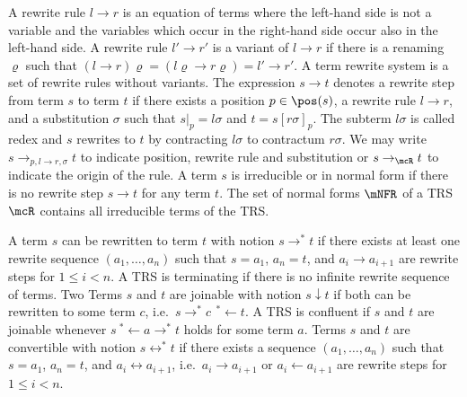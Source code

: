 \begin{definition}
A {\myem rewrite rule}  $l \rightarrow r$ is an equation of terms where the left-hand side is not a variable
and the variables which occur in the right-hand side occur also in the left-hand side.
A rewrite rule $l'\rightarrow r'$ is a {\myem variant} of $l\rightarrow r$ if there is a renaming $\varrho$ such that 
$(l\rightarrow r)\varrho = (l\varrho\rightarrow r\varrho) = l'\rightarrow r'$.
A {\myem term rewrite system} is a set of rewrite rules without variants.
%
The expression $s\rightarrow t$ denotes a {\myem rewrite step} 
from term $s$ to term $t$
if there exists 
a position $p\in\pos(s)$,
a rewrite rule $l\rightarrow r$,
and a substitution $\sigma$ such that
$s|_p=l\sigma$ and $t=s[r\sigma]_p$.
The subterm $l\sigma$ is called {\myem redex} and
$s$ rewrites to $t$ by {\myem contracting} $l\sigma$ to {\myem contractum} $r\sigma$.
%
We may write 
$s\rightarrow_{p,l\rightarrow r,\sigma}t$ to indicate position, rewrite rule and substitution
or $s\rightarrow_\mcR t$ to indicate the origin of the rule.
%
A term $s$ is {\myem irreducible} or in {\myem normal form} if there is no rewrite step $s\rightarrow t$ for any term $t$. 
The set of normal forms $\mNFR$ of a TRS $\mcR$ contains all irreducible terms of the TRS.
%
\end{definition}
\begin{definition}
A term $s$ can be rewritten to term $t$ with notion $s\rightarrow^* t$ 
if there exists at least one {\myem rewrite sequence} $(a_1,\ldots ,a_n)$ such that
$s=a_1$, $a_n=t$, and $a_i\rightarrow a_{i+1}$ are rewrite steps for $1\leq i<n$.
A TRS is {\myem terminating} if there is no infinite rewrite sequence of terms.
%
Two Terms $s$ and $t$ are {\myem joinable} with notion $s\downarrow t$ 
if both can be rewritten to some term $c$, i.e.~$s \rightarrow^*c\ \, ^*\!\!\leftarrow t$.
A TRS is {\myem confluent } if $s$ and $t$ are joinable whenever $s\ ^*\!\!\leftarrow a \rightarrow^* t$ holds for some term $a$.
%
Terms $s$ and $t$ are {\myem convertible} with notion $s\leftrightarrow^* t$ 
if there exists a sequence $(a_1,\ldots ,a_n)$ such that
$s=a_1$, $a_n=t$, and $a_i\leftrightarrow a_{i+1}$, i.e.~$a_i\rightarrow a_{i+1}$ or $a_i\leftarrow a_{i+1}$ are rewrite steps for $1\leq i<n$.
\end{definition}
